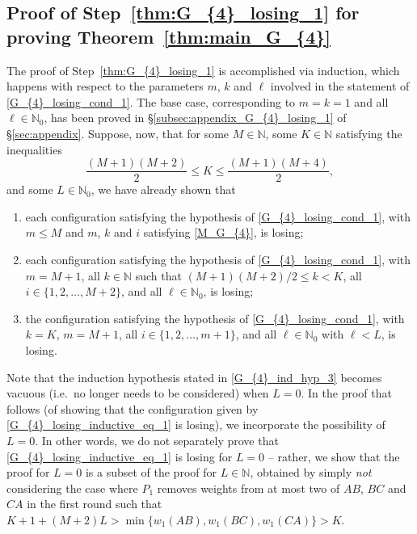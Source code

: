 \documentclass[11pt,reqno]{amsart}
\theoremstyle{definition}
\theoremstyle{definition}
\begin{document}
\subsection{Proof of Step~\ref{thm:G_{4}_losing_1} for proving Theorem~\ref{thm:main_G_{4}}}
The proof of Step~\eqref{thm:G_{4}_losing_1} is accomplished via induction, which happens with respect to the parameters $m$, $k$ and $\ell$ involved in the statement of \eqref{G_{4}_losing_cond_1}. The base case, corresponding to $m=k=1$ and all $\ell \in \mathbb{N}_{0}$, has been proved in \S\ref{subsec:appendix_G_{4}_losing_1} of \S\ref{sec:appendix}. Suppose, now, that for some $M \in \mathbb{N}$, some $K \in \mathbb{N}$ satisfying the inequalities 
\begin{equation}
\frac{(M+1)(M+2)}{2} \leqslant K \leqslant \frac{(M+1)(M+4)}{2},\label{K_M+1_inequalities}
\end{equation}
and some $L \in \mathbb{N}_{0}$, we have already shown that
\begin{enumerate}[label=(I\arabic*), ref=I\arabic*]
\item \label{G_{4}_ind_hyp_1} each configuration satisfying the hypothesis of \eqref{G_{4}_losing_cond_1}, with $m \leqslant M$ and $m$, $k$ and $i$ satisfying \eqref{M_G_{4}}, is losing;
\item \label{G_{4}_ind_hyp_2} each configuration satisfying the hypothesis of \eqref{G_{4}_losing_cond_1}, with $m=M+1$, all $k \in \mathbb{N}$ such that $(M+1)(M+2)/2 \leqslant k < K$, all $i \in \{1,2,\ldots,M+2\}$, and all $\ell \in \mathbb{N}_{0}$, is losing;
\item \label{G_{4}_ind_hyp_3} the configuration satisfying the hypothesis of \eqref{G_{4}_losing_cond_1}, with $k=K$, $m=M+1$, all $i \in \{1,2,\ldots,m+1\}$, and all $\ell \in \mathbb{N}_{0}$ with $\ell < L$, is losing.
\end{enumerate}
Note that the induction hypothesis stated in \eqref{G_{4}_ind_hyp_3} becomes vacuous (i.e.\ no longer needs to be considered) when $L=0$. In the proof that follows (of showing that the configuration given by \eqref{G_{4}_losing_inductive_eq_1} is losing), we incorporate the possibility of $L=0$. In other words, we do not separately prove that \eqref{G_{4}_losing_inductive_eq_1} is losing for $L=0$ -- rather, we show that the proof for $L=0$ is a subset of the proof for $L \in \mathbb{N}$, obtained by simply \emph{not} considering the case where $P_{1}$ removes weights from at most two of $AB$, $BC$ and $CA$ in the first round such that $K+1+(M+2)L > \min\{w_{1}(AB),w_{1}(BC),w_{1}(CA)\} > K$. 
\end{document}
